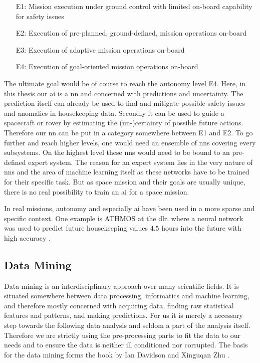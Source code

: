 \begin{enumerate}
\item[E1:] Mission execution under ground control with limited on-board capability for safety issues
\item[E2:] Execution of pre-planned, ground-defined, mission operations on-board
\item[E3:] Execution of adaptive mission operations on-board
\item[E4:] Execution of goal-oriented mission operations on-board
\end{enumerate}

The ultimate goal would be of course to reach the autonomy level E4. Here, in this thesis our \ac{ai} is a \ac{nn} and concerned with predictions and uncertainty. The prediction itself can already be used to find and mitigate possible safety issues and anomalies in housekeeping data. Secondly it can be used to guide a spacecraft or rover by estimating the (un-)certainty of possible future actions. Therefore our \ac{nn} can be put in a category somewhere between E1 and E2. \newline
To go further and reach higher levels, one would need an ensemble of \acp{nn} covering every subsystems. On the highest level these \acp{nn} would need to be bound to an pre-defined expert system. The reason for an expert system lies in the very nature of \acp{nn} and the area of machine learning itself as these networks have to be trained for their specific task. But as space mission and their goals are usually unique, there is no real possibility to train an \ac{ai} for a space mission.

In real missions, autonomy and especially \ac{ai} have been used in a more sparse and specific context. One example is ATHMOS at the \ac{dlr}, where a neural network was used to predict future housekeeping values $\num{4.5}$ hours into the future with high accuracy \cite{athmos} \cite{athmos-sub}.

\subsection{Data Mining}
Data mining is an interdisciplinary approach over many scientific fields. It is situated somewhere between data processing, informatics and machine learning, and therefore mostly concerned with acquiring data, finding raw statistical features and patterns, and making predictions. For us it is merely a necessary step towards the following data analysis and seldom a part of the analysis itself. Therefore we are strictly using the pre-processing parts to fit the data to our needs and to ensure the data is neither ill conditioned nor corrupted. The basis for the data mining forms the book by Ian Davidson and Xinguqan Zhu \cite{data-mining}.

